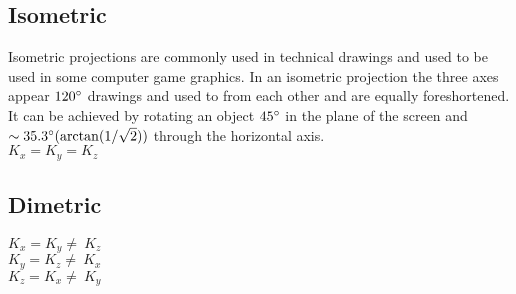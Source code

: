 \documentclass{article}
\begin{document}
\clearpage
\subsection{Isometric}
Isometric projections are commonly used in technical drawings and used to be used in some computer game graphics.
In an isometric projection the three axes appear $120\degree$ drawings and used to from each other and are equally foreshortened.
It can be achieved by rotating an object $45 \degree$ in the plane of the screen and $\sim 35.3 \degree (\arctan (1 / \sqrt 2))$ through the horizontal axis.
\\$K_x = K_y = K_z$
\subsection{Dimetric}
$K_x = K_y \neq~K_z$
\\$K_y = K_z \neq~K_x$
\\$K_z = K_x \neq~K_y$
\end{document}
